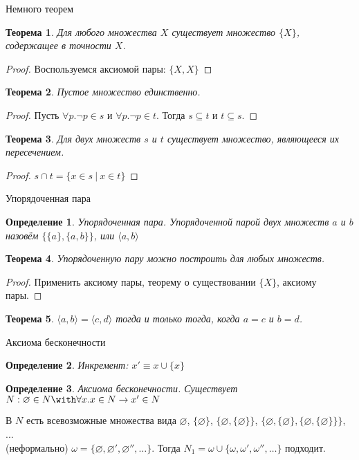 \documentclass[aspectratio=169]{beamer}
\newtheorem{thm}{Теорема}[section]
\newtheorem{dfn}{Определение}[section]
\begin{document}
\begin{frame}{Немного теорем}
\begin{thm}Для любого множества $X$ существует множество $\{X\}$, содержащее в точности $X$.\end{thm}\pause
\begin{proof}Воспользуемся аксиомой пары: $\{X,X\}$\end{proof}\pause
\begin{thm}Пустое множество единственно.\end{thm}\pause
\begin{proof}Пусть $\forall p.\neg p \in s$ и $\forall p.\neg p \in t$.
Тогда $s \subseteq t$ и $t \subseteq s$.\end{proof}\pause
\begin{thm}Для двух множеств $s$ и $t$ существует множество, являющееся их пересечением.\end{thm}\pause
\begin{proof}$s \cap t = \{ x\in s\ |\ x \in t\}$\end{proof}
\end{frame}

\begin{frame}{Упорядоченная пара}
\begin{dfn}{Упорядоченная пара.}
Упорядоченной парой двух множеств $a$ и $b$ назовём
$\{\{a\},\{a,b\}\}$, или $\langle{}a,b\rangle$
\end{dfn}

\begin{thm}
Упорядоченную пару можно построить для любых множеств.
\end{thm}
\begin{proof}Применить аксиому пары, теорему о существовании $\{X\}$, аксиому пары.\end{proof}

\begin{thm}
$\langle{}a,b\rangle = \langle{}c,d\rangle$ тогда и только тогда,
когда $a = c$ и $b = d$.
\end{thm}
\end{frame}

\begin{frame}{Аксиома бесконечности}
\begin{dfn}Инкремент: $x' \equiv x \cup \{x\}$\end{dfn}\pause
\begin{dfn}Аксиома бесконечности. Существует $N: \varnothing \in N \with \forall x.x \in N\rightarrow x' \in N$\end{dfn}\pause

В $N$ есть всевозможные множества вида $\varnothing$\pause, $\{\varnothing\}$\pause, $\{\varnothing,\{\varnothing\}\}$, \pause
$\{\varnothing,\{\varnothing\},\{\varnothing,\{\varnothing\}\}\}$, ...\pause
\\\vspace{0.5cm}
(неформально) $\omega = \{\varnothing, \varnothing', \varnothing'', \dots\}$. \pause
Тогда $N_1 = \omega\cup\{\omega,\omega',\omega'',\dots\}$ подходит.
\end{frame}
\end{document}
